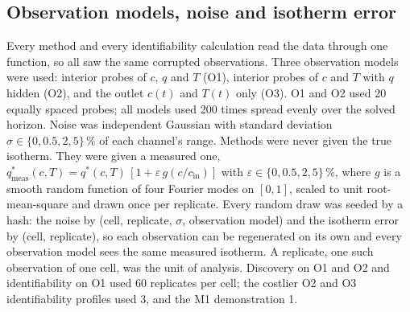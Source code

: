 \documentclass[11pt]{article}
\newcommand{\qs}{q^{*}}
\newcommand{\qsm}{q^{*}_{\mathrm{meas}}}
\begin{document}
\subsection*{Observation models, noise and isotherm error}
Every method and every identifiability calculation read the data through one function,
so all saw the same corrupted observations. Three observation models were used: interior
probes of $c$, $q$ and $T$ (O1), interior probes of $c$ and $T$ with $q$ hidden (O2), and the
outlet $c(t)$ and $T(t)$ only (O3). O1 and O2 used 20 equally spaced probes; all models
used 200 times spread evenly over the solved horizon. Noise was independent Gaussian with
standard deviation $\sigma \in \{0, 0.5, 2, 5\}\,\%$ of each channel's range. Methods were
never given the true isotherm. They were given a measured one,
$\qsm(c,T) = \qs(c,T)\,[1 + \varepsilon\, g(c/c_{\mathrm{in}})]$ with
$\varepsilon \in \{0, 0.5, 2, 5\}\,\%$, where $g$ is a smooth random function of four
Fourier modes on $[0, 1]$, scaled to unit root-mean-square and drawn once per replicate.
Every random draw was seeded by a hash: the noise by (cell, replicate, $\sigma$, observation
model) and the isotherm error by (cell, replicate), so each observation can be regenerated on
its own and every observation model sees the same measured isotherm. A replicate, one such
observation of one cell, was the unit of analysis. Discovery on O1 and O2 and identifiability
on O1 used 60 replicates per cell; the costlier O2 and O3 identifiability profiles used 3, and
the M1 demonstration 1.
\end{document}
